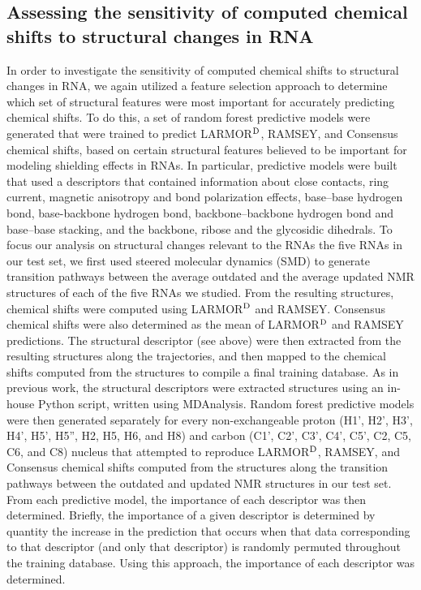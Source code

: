 \documentclass[fleqn,10pt]{wlscirep}
\begin{document}
\subsection*{Assessing the sensitivity of computed chemical shifts to structural changes in RNA} In order to investigate the sensitivity of computed chemical shifts to structural changes in RNA, we again utilized a feature selection approach to determine which set of structural features were most important for accurately predicting chemical shifts. To do this, a set of random forest predictive models were generated that were trained to predict LARMOR$^{\rm D}$, RAMSEY, and Consensus chemical shifts, based on certain structural features believed to be important for modeling shielding effects in RNAs.  In particular, predictive models were built that used a descriptors that contained information about close contacts, ring current, magnetic anisotropy and bond polarization effects, base--base  hydrogen bond, base-backbone  hydrogen bond, backbone--backbone hydrogen bond and base--base stacking, and the backbone, ribose and the glycosidic dihedrals. To focus our analysis on structural changes relevant to the RNAs the five RNAs in our test set, we first used steered molecular dynamics (SMD) to generate transition pathways between the average outdated and the average updated NMR structures of each of the five RNAs we studied. From the resulting structures, chemical shifts were computed using LARMOR$^{\rm D}$ and RAMSEY. Consensus chemical shifts were also determined as the mean of LARMOR$^{\rm D}$ and RAMSEY predictions. The structural descriptor (see above) were then extracted from the resulting structures along the trajectories, and then mapped to the chemical shifts computed from the structures to compile a final training database. As in previous work, the structural descriptors were extracted structures using an in-house Python script, written using MDAnalysis\cite{michaud2011mdanalysis}. Random forest predictive models were then generated separately for every non-exchangeable proton (H1', H2', H3', H4', H5', H5'', H2, H5, H6, and H8) and carbon (C1', C2', C3', C4', C5', C2, C5, C6, and C8) nucleus that attempted to reproduce LARMOR$^{\rm D}$, RAMSEY, and Consensus chemical shifts computed from the structures along the transition pathways between the outdated and updated NMR structures in our test set. From each predictive model, the importance of each descriptor was then determined. Briefly, the importance of a given descriptor is determined by quantity the increase in the prediction that occurs when that data corresponding to that descriptor (and only that descriptor) is randomly permuted throughout the training database. Using this approach, the importance of each descriptor was determined.
\end{document}
